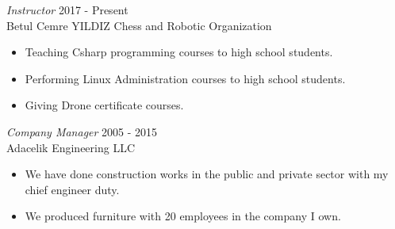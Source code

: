 \documentclass[line,margin]{res}
\begin{document}
\begin{resume}
                {\sl  Instructor} \hfill             2017 - Present \\
                Betul Cemre YILDIZ Chess and Robotic Organization
                 \begin{itemize}  \itemsep -2pt %
                 \item Teaching Csharp programming courses to high school students.
                 \item Performing  Linux Administration courses to high school students.
                 \item Giving Drone certificate courses.
                 \end{itemize} 

                 
                {\sl Company Manager} \hfill        2005 - 2015 \\
                Adacelik Engineering LLC
                  \begin{itemize}
                   \item We have done construction works in the public and private sector with my chief engineer duty.
                     
                   \item We produced furniture with 20 employees in the company I own.
                   \end{itemize} 


\end{resume}
\end{document}
